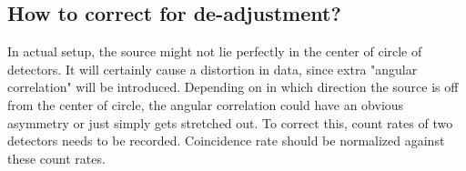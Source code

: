 \subsection{How to correct for de-adjustment?}
In actual setup, the source might not lie perfectly in the center of circle of detectors. It will certainly cause a distortion in data, since extra "angular correlation" will be introduced. Depending on in which direction the source is off from the center of circle, the angular correlation could have an obvious asymmetry or just simply gets stretched out. To correct this, count rates of two detectors needs to be recorded. Coincidence rate should be normalized against these count rates.
